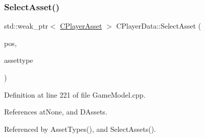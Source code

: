 \subsubsection{\texorpdfstring{Select\+Asset()}{SelectAsset()}}
{\footnotesize\ttfamily std\+::weak\+\_\+ptr$<$ \hyperlink{classCPlayerAsset}{C\+Player\+Asset} $>$ C\+Player\+Data\+::\+Select\+Asset (\begin{DoxyParamCaption}\item[{const \hyperlink{classCPosition}{C\+Position} \&}]{pos,  }\item[{\hyperlink{GameDataTypes_8h_a5600d4fc433b83300308921974477fec}{E\+Asset\+Type}}]{assettype }\end{DoxyParamCaption})}



Definition at line 221 of file Game\+Model.\+cpp.



References at\+None, and D\+Assets.



Referenced by Asset\+Types(), and Select\+Assets().


